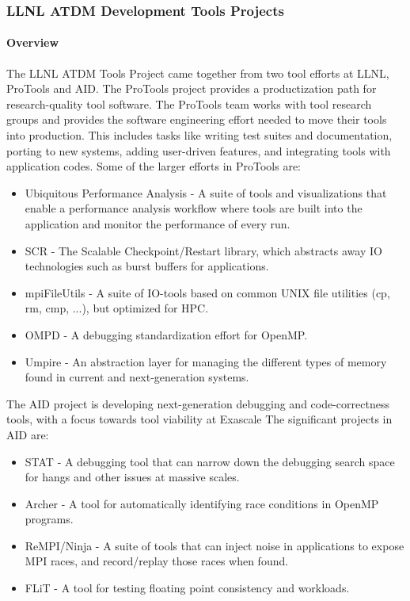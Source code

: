 \subsubsection{LLNL ATDM Development Tools Projects}

\paragraph{Overview} The LLNL ATDM Tools Project came together from two tool efforts at LLNL, ProTools and AID.  The ProTools project provides a productization path for research-quality tool software.  The ProTools team works with tool research groups and provides the software engineering effort needed to move their tools into production.  This includes tasks like writing test suites and documentation, porting to new systems, adding user-driven features, and integrating tools with application codes.  Some of the larger efforts in ProTools are:

\begin{itemize}
\itemsep 0em 
\item Ubiquitous Performance Analysis - A suite of tools and visualizations that enable a performance analysis workflow where tools are built into the application and monitor the performance of every run.
\item SCR - The Scalable Checkpoint/Restart library, which abstracts away IO technologies such as burst buffers for applications.
\item mpiFileUtils - A suite of IO-tools based on common UNIX file utilities (cp, rm, cmp, ...), but optimized for HPC.
\item OMPD - A debugging standardization effort for OpenMP.
\item Umpire - An abstraction layer for managing the different types of memory found in current and next-generation systems.
\end{itemize}

The AID project is developing next-generation debugging and code-correctness tools, with a focus towards tool viability at Exascale  The significant projects in AID are:
\begin{itemize}
\itemsep 0em 
\item STAT - A debugging tool that can narrow down the debugging search space for hangs and other issues at massive scales.
\item Archer - A tool for automatically identifying race conditions in OpenMP programs.
\item ReMPI/Ninja - A suite of tools that can inject noise in applications to expose MPI races, and record/replay those races when found.
\item FLiT - A tool for testing floating point consistency and workloads.
\end{itemize}

